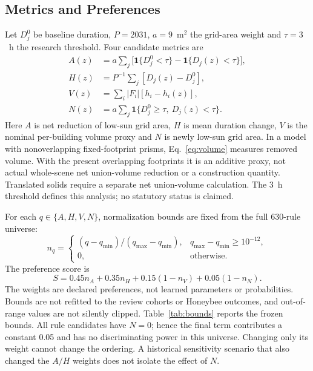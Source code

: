 \documentclass{llncs}
\newcommand{\ind}{\mathbf{1}}
\begin{document}
\subsection{Metrics and Preferences}
Let $D_j^0$ be baseline duration, $P=2031$, $a=9$~m$^2$ the grid-area weight and $\tau=3$~h the research threshold. Four candidate metrics are
\begin{align}
 A(z)&=a\sum_j\big[\ind\{D_j^0<\tau\}-\ind\{D_j(z)<\tau\}\big],\label{eq:area}\\
 H(z)&=P^{-1}\sum_j[D_j(z)-D_j^0],\label{eq:hours}\\
 V(z)&=\sum_i |F_i|[h_i-h_i(z)],\label{eq:volume}\\
 N(z)&=a\sum_j\ind\{D_j^0\geq\tau,\ D_j(z)<\tau\}.\label{eq:new}
\end{align}
Here $A$ is net reduction of low-sun grid area, $H$ is mean duration change, $V$ is the nominal per-building volume proxy and $N$ is newly low-sun grid area. In a model with nonoverlapping fixed-footprint prisms, Eq.~\ref{eq:volume} measures removed volume. With the present overlapping footprints it is an additive proxy, not actual whole-scene net union-volume reduction or a construction quantity. Translated solids require a separate net union-volume calculation. The 3~h threshold defines this analysis; no statutory status is claimed.

For each $q\in\{A,H,V,N\}$, normalization bounds are fixed from the full 630-rule universe:
\begin{equation}
 n_q=\begin{cases}(q-q_{\min})/(q_{\max}-q_{\min}),&q_{\max}-q_{\min}\geq10^{-12},\\0,&\text{otherwise}.\end{cases}
 \label{eq:norm}
\end{equation}
The preference score is
\begin{equation}
 S=0.45n_A+0.35n_H+0.15(1-n_V)+0.05(1-n_N).
 \label{eq:score}
\end{equation}
The weights are declared preferences, not learned parameters or probabilities. Bounds are not refitted to the review cohorts or Honeybee outcomes, and out-of-range values are not silently clipped. Table~\ref{tab:bounds} reports the frozen bounds. All rule candidates have $N=0$; hence the final term contributes a constant 0.05 and has no discriminating power in this universe. Changing only its weight cannot change the ordering. A historical sensitivity scenario that also changed the $A/H$ weights does not isolate the effect of $N$.
\end{document}
